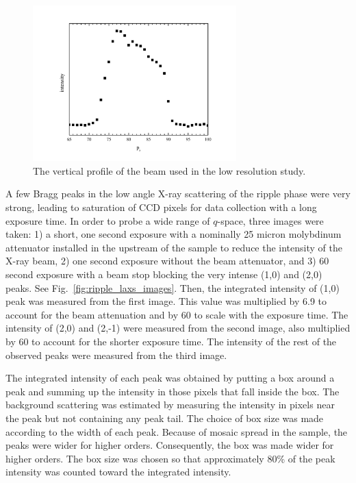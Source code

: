 \begin{figure}[htbp]
  \centering
  \includegraphics[width=0.7\textwidth]{figures/ripple/beamz_lr}
  \caption{The vertical profile of the beam used in the low resolution study.}
  \label{fig:ripple_lr_beamz}
\end{figure}

A few Bragg peaks in the low angle X-ray scattering of the ripple phase
were very strong, leading to saturation of CCD pixels for data collection
with a long exposure time. 
In order to probe a wide range of $q$-space, three images were taken:
1) a short, one second exposure with a nominally 25 micron 
molybdinum attenuator installed in the upstream of the sample to reduce the intensity
of the X-ray beam, 2) one second exposure without the beam attenuator,
and 3) 60 second exposure with a beam stop blocking the very intense 
(1,0) and (2,0) peaks. See Fig.~\ref{fig:ripple_laxs_images}. 
Then, the integrated intensity of (1,0) peak was measured
from the first image. This value was multiplied by 6.9 to account for the beam
attenuation and by 60 to scale with the exposure time. 
The intensity of (2,0) and (2,-1) were measured from the second image, also
multiplied by 60 to account for the shorter exposure time. The intensity of
the rest of the observed peaks were measured from the third image.

The integrated intensity of each peak was obtained by putting a box around a
peak and summing up the intensity in those pixels that fall inside the box.
The background scattering was estimated by measuring the intensity in pixels
near the peak but not containing any peak tail. The choice of box size was 
made according to the width of each peak. Because of mosaic spread in the sample,
the peaks were wider for higher orders. 
Consequently, the box was made wider for higher
orders. The box size was chosen so that approximately 80\% of the peak intensity
was counted toward the integrated intensity.

